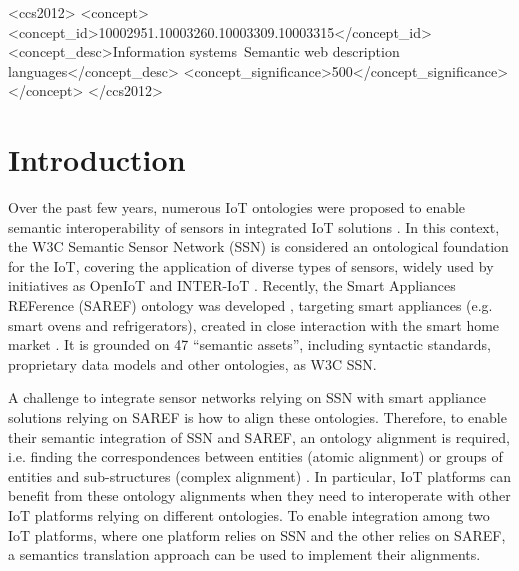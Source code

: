 \documentclass{sig-alternate-05-2015}
\begin{document}
%
%
\begin{CCSXML}
<ccs2012>
<concept>
<concept_id>10002951.10003260.10003309.10003315</concept_id>
<concept_desc>Information systems~Semantic web description languages</concept_desc>
<concept_significance>500</concept_significance>
</concept>
</ccs2012>
\end{CCSXML}



%
%

%
%
\printccsdesc



\section{Introduction}

Over the past few years, numerous IoT ontologies were proposed to enable semantic interoperability of sensors in integrated IoT solutions \cite{Ganzha2016a}. In this context, the W3C Semantic Sensor Network (SSN) is considered an ontological foundation for the IoT, covering the application of diverse types of sensors, widely used by initiatives as OpenIoT and INTER-IoT \cite{Ganzha2017a}. 
Recently, the Smart Appliances REFerence (SAREF) ontology was developed \cite{Daniele2015}, targeting smart appliances (e.g. smart ovens and refrigerators), created in close interaction with the smart home market \cite{Daniele2016}. It is grounded on 47 “semantic assets”, including syntactic standards, proprietary data models and other ontologies, as W3C SSN. 

A challenge to integrate sensor networks relying on SSN with smart appliance solutions relying on SAREF is how to align these ontologies. Therefore, to enable their semantic integration of SSN and SAREF, an ontology alignment is required, i.e. finding the correspondences between entities (atomic alignment) or groups of entities and sub-structures (complex alignment) \cite{Ganzha2015}. In particular, IoT platforms can benefit from these ontology alignments when they need to interoperate with other IoT platforms relying on different ontologies. To enable integration among two IoT platforms, where one platform relies on SSN and the other relies on SAREF, a semantics translation approach can be used to implement their alignments.
\end{document}
